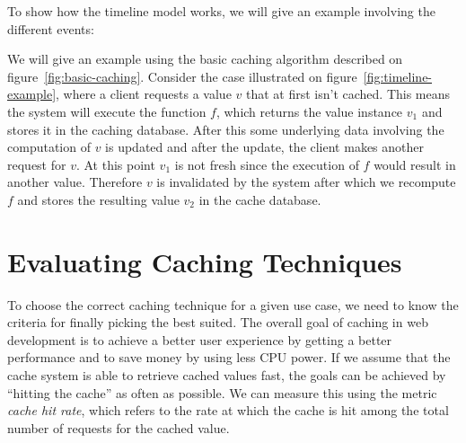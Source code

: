 To show how the timeline model works, we will give an example involving the different events:

\begin{example}
\label{example:timeline-model}
We will give an example using the basic caching algorithm described on figure~\ref{fig:basic-caching}. Consider the case illustrated on figure~\ref{fig:timeline-example}, where a client requests a value $v$ that at first isn't cached. This means the system will execute the function $f$, which returns the value instance $v_1$ and stores it in the caching database. After this some underlying data involving the computation of $v$ is updated and after the update, the client makes another request for $v$. At this point $v_1$ is not fresh since the execution of $f$ would result in another value. Therefore $v$ is invalidated by the system after which we recompute $f$ and stores the resulting value $v_2$ in the cache database.

\begin{figure*}[ht!]
  \centering
  \caption{Example of the timeline model}
  \label{fig:timeline-example}
\end{figure*}

\end{example}





\section{Evaluating Caching Techniques}
\label{sec:evaluating_caching_techniques}


To choose the correct caching technique for a given use case, we need to know the criteria for finally picking the best suited. The overall goal of caching in web development is to achieve a better user experience by getting a better performance and to save money by using less CPU power. If we assume that the cache system is able to retrieve cached values fast, the goals can be achieved by ``hitting the cache'' as often as possible. We can measure this using the metric \emph{cache hit rate}, which refers to the rate at which the cache is hit among the total number of requests for the cached value.

